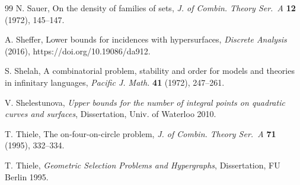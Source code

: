 \documentclass[11pt]{article}
\theoremstyle{plain}
\theoremstyle{definition}
\theoremstyle{remark}
\begin{document}
\begin{thebibliography}{99}
 N. Sauer, On the density of families of sets, \emph{J. of Combin.
Theory Ser.~A} \textbf{12} (1972), 145--147.

 A. Sheffer, Lower bounds for incidences with hypersurfaces, \emph{Discrete Analysis} (2016), https://doi.org/10.19086/da912.

 S. Shelah, A combinatorial problem, stability and order for models
and theories in infinitary languages, \emph{Pacific J. Math.} \textbf{41} (1972), 247--261.


 V. Shelestunova, \emph{Upper bounds for the number of integral points on quadratic curves and surfaces}, Dissertation, Univ. of Waterloo 2010.

 T. Thiele, The on-four-on-circle problem, \emph{J. of Combin. Theory Ser.~A} \textbf{71} (1995), 332--334. 

 T. Thiele, \emph{Geometric Selection Problems and Hypergraphs}, Dissertation, FU Berlin 1995. 









\end{thebibliography}
\end{document}
